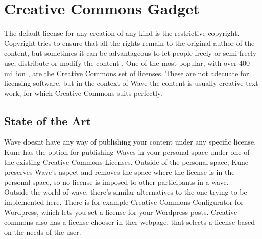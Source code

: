 \section{Creative Commons Gadget}

The default license for any creation of any kind is the restrictive copyright. Copyright tries to ensure that all the rights remain to the original author of the content, but sometimes it can be advantageous to let people freely or semi-freely use, distribute or modify the content \cite{ref:oss_why}. One of the most popular, with over 400 million \cite{ref:the_power_of_open}, are the Creative Commons set of licenses. These are not adecuate for licensing software, but in the context of Wave the content is usually creative text work, for which Creative Commons suits perfectly.

\label{subsec:cc_soa}
\subsection{State of the Art}
Wave doesnt have any way of publishing your content under any specific license. Kune has the option for publishing Waves in your personal space under one of the existing Creative Commons Licenses. Outside of the personal space, Kune preserves Wave's aspect and removes the space where the license is in the personal space, so no license is imposed to other participants in a wave.\\[.2cm]
Outside the world of wave, there's similar alternatives to the one trying to be implemented here. There is for example Creative Commons Configurator for Wordpress, which lets you set a license for your Wordpress posts. Creative commons also has a license chooser \cite{cc_chooser} in ther webpage, that selects a license based on the needs of the user.
